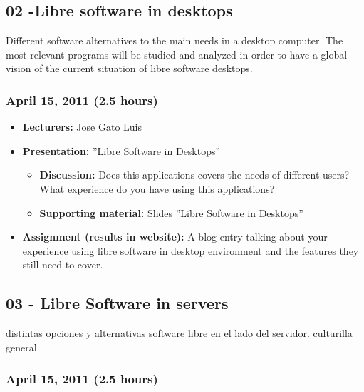 \documentclass[a4paper]{article}
\begin{document}
\subsection{02 -Libre software in desktops}

Different software alternatives to the main needs in a desktop computer. The most relevant programs will be studied and analyzed in order to have a global vision of the current situation of libre software desktops. 

\subsubsection{April 15, 2011 (2.5 hours)}

\begin{itemize}
\item \textbf{Lecturers:} Jose Gato Luis
\item \textbf{Presentation:} ''Libre Software in Desktops''
  \begin{itemize}
  \item \textbf{Discussion:} Does this applications covers the needs of different users? What experience do you have using this applications?
  \item \textbf{Supporting material:} Slides ''Libre Software in Desktops''
  \end{itemize}
\item \textbf{Assignment (results in website):} A blog entry talking about your experience using libre software in desktop environment and the features they still need to cover. 
\end{itemize}

\subsection{03 - Libre Software in servers}

distintas opciones y alternativas software libre en el lado del servidor. culturilla general

\subsubsection{April 15, 2011 (2.5 hours)}
\end{document}
